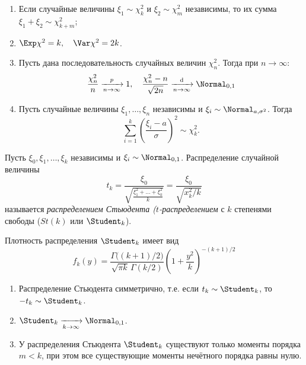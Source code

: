 \begin{namedthm}\leavevmode
\begin{enumerate}
    \item Если случайные величины $\xi_1 \sim \chi^{2}_{k}$ и $\xi_2 \sim \chi^{2}_{m}$ независимы, то их сумма $\xi_1+\xi_2 \sim \chi^{2}_{k+m}$;
    \item $\Exp \chi^{2}=k, \quad \Var \chi^{2}=2 k$.
    \item Пусть дана последовательность случайных величин $\chi_{n}^{2}$. Тогда при $n \to \infty$:
    \begin{equation*}
        \frac{\chi_{n}^{2}}{n} \xrightarrow[n \to \infty]{p} 1, 
        \quad \frac{\chi_{n}^{2}-n}{\sqrt{2 n}} \xrightarrow[n \to \infty]{\text{d}} \Normal_{0,1}
    \end{equation*}
    \item Пусть случайные величины $\xi_1, \ldots, \xi_n$ независимы и $\xi_i \sim \Normal_{a,\sigma^{2}}$. Тогда
    \begin{equation*}
        \sum\limits_{i=1}^{k}\left(\frac{\xi_{i}-a}{\sigma}\right)^{2} \sim \chi^{2}_{k}.
    \end{equation*}
\end{enumerate}
\end{namedthm}

\begin{defn}
    Пусть $\xi_{0}, \xi_{1}, \ldots, \xi_{k}$ независимы и $\xi_i \sim \Normal_{0,1}$. Распределение случайной величины
    \begin{equation*}
        t_{k}
        = \frac{\xi_{0}}{\sqrt{\frac{\xi_{1}^{2} + \ldots + \xi_{k}^{2}}{k}}} 
        = \frac{\xi_0}{\sqrt{x_{k}^{2} / k}}
    \end{equation*}
    называется \textit{распределением Стьюдента ($t$-распределением} с $k$ степенями свободы ($St(k)$ или $\Student_{k}$).
\end{defn}
Плотность распределения $\Student_{k}$ имеет вид
\begin{equation*}
    f_{k}(y)=\frac{\Gamma\bigl((k+1) / 2\bigr)}{\sqrt{\pi k} \, \Gamma(k / 2)}\left(1+\frac{y^{2}}{k}\right)^{-(k+1) / 2}
\end{equation*}

\begin{namedthm}\leavevmode
\begin{enumerate}
    \item Распределение Стьюдента симметрично, т.е. если $t_k \sim \Student_{k}$, то $-t_k \sim \Student_{k}$.
    \item $\Student_{k} \xrightarrow[k \to \infty]{} \Normal_{0,1}$.
    \item У распределения Стьюдента $\Student_{k}$ существуют только моменты порядка $m < k$, при этом все существующие моменты нечётного порядка равны нулю.
\end{enumerate}
\end{namedthm}

